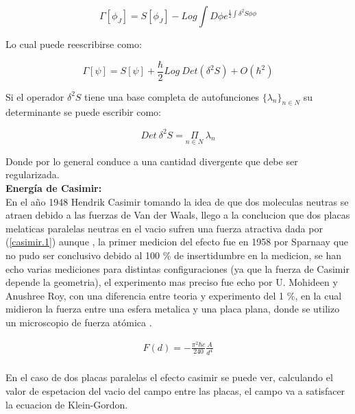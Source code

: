 \begin{equation}
\Gamma [\phi _J ] = S [ \phi _J ] - Log \int D \phi e ^{\frac{1}{2} \int \delta ^2 S \phi \phi }
\end{equation}


Lo cual puede reescribirse como:

\begin{equation}
\Gamma [\psi] = S [\psi] + \frac{\hbar}{2} Log \ Det ( \delta ^2 S ) +
O ( \hbar ^2 )
\end{equation}


Si el operador $ \delta ^2 S $ tiene una base completa de autofunciones $ \{ \lambda _n \} _{n \in N}$ su determinante se puede escribir como:

\begin{equation}
Det \ \delta ^2 S = \underset{ n \in N }{ \Pi } \ \lambda _n
\end{equation}

Donde por lo general conduce a una cantidad divergente que debe ser regularizada.\\



\textbf{Energía de Casimir:} \\ 

En el año 1948 Hendrik Casimir tomando la idea de que dos moleculas neutras se atraen debido a las fuerzas de Van der Waals, llego a la conclucion que dos placas melaticas paralelas neutras en el vacio sufren una fuerza atractiva dada por (\ref{casimir.1}) aunque , la primer medicion del efecto fue en 1958 por Sparnaay que no pudo ser conclusivo debido al 100 \% de insertidumbre en la medicion, se han echo varias mediciones para distintas configuraciones (ya que la fuerza de Casimir depende la geometria), el experimento mas preciso fue echo por U. Mohideen y Anushree Roy, con una diferencia entre teoria y experimento del 1 \%, en la cual midieron la fuerza entre una esfera metalica y una placa plana, donde se utilizo un microscopio de fuerza atómica \cite{BORDAG20011} .


\begin{equation}
\begin{array}{c}
F(d) = - \frac{\pi ^2 \hbar c}{240} \frac{A}{d^4} \\
\end{array} 
\label{casimir.1}
\end{equation}




En el caso de dos placas paralelas el efecto casimir se puede ver, calculando el valor de espetacion del vacio del campo entre las placas, el campo va a satisfacer la ecuacion de Klein-Gordon.

